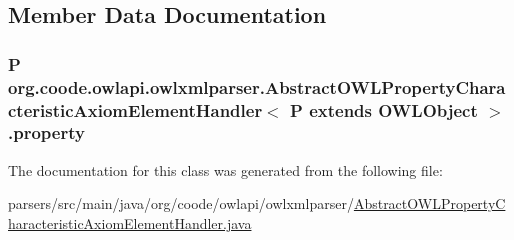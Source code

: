\subsection{Member Data Documentation}
\hypertarget{classorg_1_1coode_1_1owlapi_1_1owlxmlparser_1_1_abstract_o_w_l_property_characteristic_axiom_ele9cffca01c8ac3125149e1d413d627e29_a90c94b32dc335fe76fe30bb008abc9fd}{
\subsubsection[{property}]{\setlength{\rightskip}{0pt plus 5cm}P org.\-coode.\-owlapi.\-owlxmlparser.\-Abstract\-O\-W\-L\-Property\-Characteristic\-Axiom\-Element\-Handler$<$ P extends {\bf O\-W\-L\-Object} $>$.property\hspace{0.3cm}{\ttfamily [private]}}}\label{classorg_1_1coode_1_1owlapi_1_1owlxmlparser_1_1_abstract_o_w_l_property_characteristic_axiom_ele9cffca01c8ac3125149e1d413d627e29_a90c94b32dc335fe76fe30bb008abc9fd}


The documentation for this class was generated from the following file\-:\begin{DoxyCompactItemize}
\item 
parsers/src/main/java/org/coode/owlapi/owlxmlparser/\hyperlink{_abstract_o_w_l_property_characteristic_axiom_element_handler_8java}{Abstract\-O\-W\-L\-Property\-Characteristic\-Axiom\-Element\-Handler.\-java}\end{DoxyCompactItemize}
